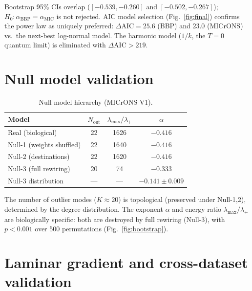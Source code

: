 \documentclass[aps,pre,twocolumn,showpacs,superscriptaddress,longbibliography]{revtex4-2}
\newcommand{\lp}{\lambda_{+}}
\newcommand{\lmax}{\lambda_{\max}}
\begin{document}
Bootstrap 95\% CIs overlap ($[-0.539,-0.260]$ and $[-0.502,-0.267]$);
$H_0: \alpha_{\mathrm{BBP}} = \alpha_{\mathrm{MIC}}$ is not rejected.
AIC model selection (Fig.~\ref{fig:final}) confirms the power law
as uniquely preferred: $\Delta\mathrm{AIC} = 25.6$ (BBP) and
$23.0$ (MICrONS) vs.\ the next-best log-normal model. The harmonic
model ($1/k$, the $T{=}0$ quantum limit) is eliminated with
$\Delta\mathrm{AIC} > 219$.

\section{\label{sec:null}Null model validation}

\begin{table}[h]
\caption{\label{tab:null}Null model hierarchy (MICrONS V1).}
\begin{ruledtabular}
\begin{tabular}{lccc}
Model & $N_{\mathrm{out}}$ & $\lmax/\lp$ & $\alpha$ \\
\hline
Real (biological)         & 22 & 1626  & $-0.416$ \\
Null-1 (weights shuffled) & 22 & 1640  & $-0.416$ \\
Null-2 (destinations)     & 22 & 1620  & $-0.416$ \\
Null-3 (full rewiring)    & 20 &   74  & $-0.333$ \\
Null-3 distribution       & —  &    —  & $-0.141 \pm 0.009$ \\
\end{tabular}
\end{ruledtabular}
\end{table}

The number of outlier modes ($K\approx 20$) is topological
(preserved under Null-1,2), determined by the degree distribution.
The exponent $\alpha$ and energy ratio $\lmax/\lp$ are
biologically specific: both are destroyed by full rewiring
(Null-3), with $p < 0.001$ over 500 permutations
(Fig.~\ref{fig:bootstrap}).

\section{\label{sec:laminar}Laminar gradient and cross-dataset validation}
\end{document}
